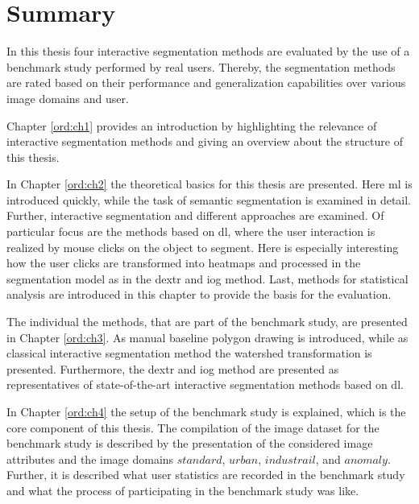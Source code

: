 
\section{Summary}

In this thesis four interactive segmentation methods are evaluated by the use of a benchmark study performed by real users.
Thereby, the segmentation methods are rated based on their performance and generalization capabilities over various image domains and user.


Chapter \ref{ord:ch1} provides an introduction by highlighting the relevance of interactive segmentation methods and giving an overview about the structure of this thesis.

In Chapter \ref{ord:ch2} the theoretical basics for this thesis are presented.
Here \gls{ml} is introduced quickly, while the task of semantic segmentation is examined in detail.
Further, interactive segmentation and different approaches are examined.
Of particular focus are the methods based on \gls{dl}, where the user interaction is realized by mouse clicks on the object to segment.
Here is especially interesting how the user clicks are transformed into heatmaps and processed in the segmentation model as in the \gls{dextr} and \gls{iog} method.
Last, methods for statistical analysis are introduced in this chapter to provide the basis for the evaluation.

The individual the methods, that are part of the benchmark study, are presented in Chapter \ref{ord:ch3}.
As manual baseline polygon drawing is introduced, while as classical interactive segmentation method the watershed transformation is presented.
Furthermore, the \gls{dextr} \cite{Man18-DEXTR} and \gls{iog} \cite{Zha20-IOG} method are presented as representatives of state-of-the-art interactive segmentation methods based on \gls{dl}.

In Chapter \ref{ord:ch4} the setup of the benchmark study is explained, which is the core component of this thesis.
The compilation of the image dataset for the benchmark study is described by the presentation of the considered image attributes and the image domains $ standard $, $ urban $, $ industrail $, and $ anomaly $.
Further, it is described what user statistics are recorded in the benchmark study and what the process of participating in the benchmark study was like.

